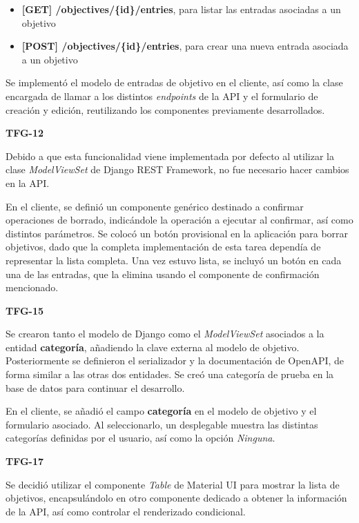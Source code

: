 \documentclass[10pt, a4paper]{aqademic}
\begin{document}
\begin{itemize}
	\item \textbf{[GET] /objectives/\{id\}/entries}, para listar las entradas asociadas a un objetivo
	\item \textbf{[POST] /objectives/\{id\}/entries}, para crear una nueva entrada asociada a un objetivo
\end{itemize}

Se implementó el modelo de entradas de objetivo en el cliente, así como la clase encargada de llamar a los distintos \textit{endpoints} de la API y el formulario de creación y edición, reutilizando los componentes previamente desarrollados.

\medskip

\textbf{TFG-12}

Debido a que esta funcionalidad viene implementada por defecto al utilizar la clase \textit{ModelViewSet} de Django REST Framework, no fue necesario hacer cambios en la API.

En el cliente, se definió un componente genérico destinado a confirmar operaciones de borrado, indicándole la operación a ejecutar al confirmar, así como distintos parámetros. Se colocó un botón provisional en la aplicación para borrar objetivos, dado que la completa implementación de esta tarea dependía de representar la lista completa. Una vez estuvo lista, se incluyó un botón en cada una de las entradas, que la elimina usando el componente de confirmación mencionado. 

\medskip

\textbf{TFG-15}

Se crearon tanto el modelo de Django como el \textit{ModelViewSet} asociados a la entidad \textbf{categoría}, añadiendo la clave externa al modelo de objetivo. Posteriormente se definieron el serializador y la documentación de OpenAPI, de forma similar a las otras dos entidades. Se creó una categoría de prueba en la base de datos para continuar el desarrollo.

En el cliente, se añadió el campo \textbf{categoría} en el modelo de objetivo y el formulario asociado. Al seleccionarlo, un desplegable muestra las distintas categorías definidas por el usuario, así como la opción \textit{Ninguna}. 

\medskip

\textbf{TFG-17}

Se decidió utilizar el componente \textit{Table} de Material UI para mostrar la lista de objetivos, encapsulándolo en otro componente dedicado a obtener la información de la API, así como controlar el renderizado condicional.
\end{document}
